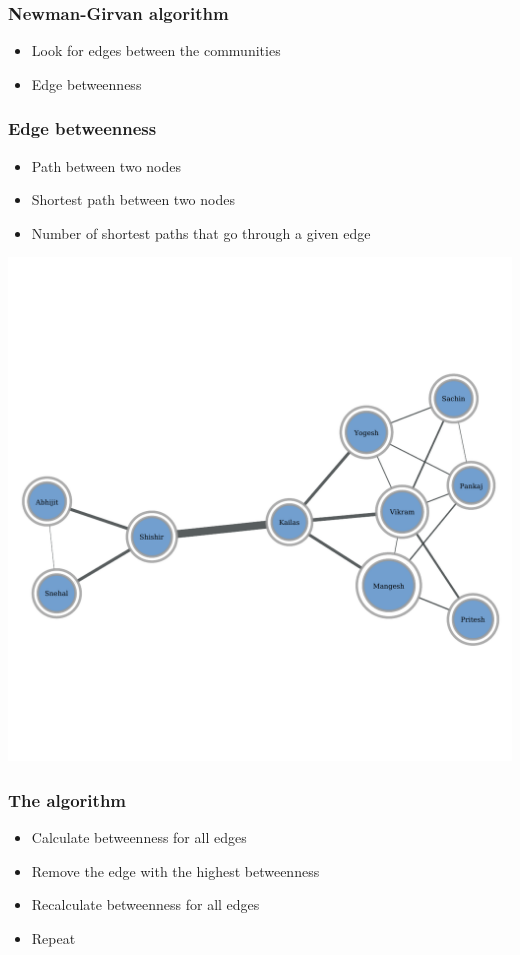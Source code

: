 \documentclass{beamer}
\begin{document}
\begin{frame}
    \frametitle{Newman-Girvan algorithm}
    \centering
    
    \begin{itemize}
        \setlength\itemsep{1em}
        \item{Look for edges between the communities}

        \item{Edge betweenness}
    \end{itemize}
\end{frame}
\begin{frame}
    \frametitle{Edge betweenness}
    \centering
    \vspace{2em}
        \begin{itemize}
        \setlength\itemsep{1em}
            \item{Path between two nodes}
            \item{Shortest path between two nodes}
            \item{Number of shortest paths that go through a given edge}
        \end{itemize}
    \includegraphics[width=0.7\columnwidth,trim=0 0 0 130,clip=true]{msc3.pdf}

\end{frame}
\begin{frame}
    \frametitle{The algorithm}
    \centering

    \begin{itemize}
    \setlength\itemsep{1em}
        \item{Calculate betweenness for all edges}
        \item{Remove the edge with the highest betweenness}
        \item{Recalculate betweenness for all edges}
        \item{Repeat}
    \end{itemize}
\end{frame}
\end{document}
